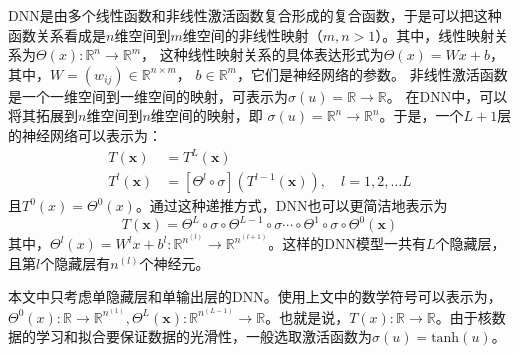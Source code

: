 DNN是由多个线性函数和非线性激活函数复合形成的复合函数，于是可以把这种函数关系看成是$n$维空间到$m$维空间的非线性映射（$m,n>1$）。其中，线性映射关系为$\Theta(x):\mathbb{R}^n\rightarrow \mathbb{R}^{m}$，
这种线性映射关系的具体表达形式为$\Theta(x) = Wx + b$，
其中，$W = (w_{ij})\in \mathbb{R}^{n\times m}$，
$b\in \mathbb{R}^m$，它们是神经网络的参数。
非线性激活函数是一个一维空间到一维空间的映射，可表示为$\sigma (u) = \mathbb{R}\rightarrow \mathbb{R}$。
在DNN中，可以将其拓展到$n$维空间到$n$维空间的映射，即
$\sigma (u) = \mathbb{R}^{n}\rightarrow \mathbb{R}^{n}$。于是，一个$L+1$层的神经网络可以表示为：
\begin{equation}
    \begin{aligned}
T(\boldsymbol{x}) & =T^{L}(\boldsymbol{x}) \\
T^{l}(\boldsymbol{x}) & =\left[\Theta^{l} \circ \sigma\right]\left(T^{l-1}(\boldsymbol{x})\right), \quad l=1,2, \ldots L
\end{aligned}
\end{equation}
且$T^{0}(x) = \Theta^{0}(x)$。通过这种递推方式，DNN也可以更简洁地表示为
\begin{equation}
    T(\boldsymbol{x})=\Theta^{L} \circ \sigma \circ \Theta^{L-1} \circ \sigma \cdots \circ \Theta^{1} \circ \sigma \circ \Theta^{0}(\boldsymbol{x})
\end{equation}
其中，$\Theta ^{l}(x)=W^{l}x+b^{l}:\mathbb{R}^{n^{(l)}}\rightarrow \mathbb{R}^{n^{(l+1)}}$。这样的DNN模型一共有$L$个隐藏层，且第$l$个隐藏层有$n^{(l)}$个神经元。

本文中只考虑单隐藏层和单输出层的DNN。使用上文中的数学符号可以表示为，$\Theta^{0}(x): \mathbb{R} \rightarrow \mathbb{R}^{n^{(1)}}, \Theta^{L}(\boldsymbol{x}):\mathbb{R}^{n^{(L-1)}}\rightarrow \mathbb{R}$。也就是说，$T(x):\mathbb{R}\rightarrow \mathbb{R}$。由于核数据的学习和拟合要保证数据的光滑性，一般选取激活函数为$\sigma (u)=\text{tanh}(u)$。

